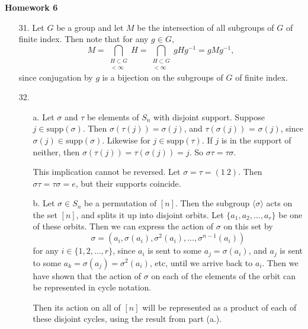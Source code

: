 \documentclass[11pt, reqno]{article}
\theoremstyle{plain}
\theoremstyle{definition}
\theoremstyle{remark}
\begin{document}
\topmargin=-40pt
\renewcommand{\headrulewidth}{1pt}
\renewcommand{\headsep}{20pt}
\thispagestyle{fancy}

{\Huge \bfseries \noindent Homework 6}

\begin{enumerate}
    \item[31.] Let $G$ be a group and let $M$ be the intersection of all subgroups of $G$ of finite
    index. Then note that for any $g \in G$,
    \[
        M = \bigcap_{\substack{H \subset G\\ [G:H] < \infty}}H  = \bigcap_{\substack{H \subset G\\ [G:H] < \infty}} gHg^{-1} = gMg^{-1},
    \]
    since conjugation by $g$ is a bijection on the subgroups of $G$ of finite index.

    \item[32.] \begin{enumerate}
        \item[a.] Let $\sigma$ and $\tau$ be elements of $S_n$ with disjoint support. Suppose $j \in \text{supp}(\sigma)$. 
        Then $\sigma(\tau(j)) = \sigma(j)$, and $\tau(\sigma(j))$ = $\sigma(j)$, since $\sigma(j) \in \text{supp}(\sigma)$.
        Likewise for $j \in \text{supp}(\tau)$. If $j$ is in the support of neither, then $\sigma(\tau(j)) = \tau(\sigma(j)) = j$.
        So $\sigma\tau = \tau \sigma$.

        This implication cannot be reversed. Let $\sigma = \tau = (1\ 2)$. Then $\sigma\tau = \tau\sigma = e$, but their supports 
        coincide. 

        \item[b.] Let $\sigma \in S_n$ be a permutation of $[n]$. Then the subgroup $\langle \sigma \rangle$ acts on
        the set $[n]$, and splits it up into disjoint orbits. Let $\{a_1, a_2, \dots, a_r\}$ be one of these orbits. Then
        we can express the action of $\sigma$ on this set by 
        \[
            \sigma = (a_i, \sigma(a_i), \sigma^2(a_i), \dots, \sigma^{n-1}(a_i))
        \]
        for any $i \in \{1, 2, \dots, r\}$, since $a_i$ is sent to some $a_j = \sigma(a_i)$, and $a_j$ is sent to some 
        $a_k = \sigma(a_j) = \sigma^2(a_i)$, etc, until we arrive back to $a_i$. Then we have shown that the action of $\sigma$
        on each of the elements of the orbit can be represented in cycle notation. 

        Then its action on all of $[n]$ will be represented as a product of each of these disjoint cycles, using 
        the result from part (a.).


\end{enumerate}
\end{enumerate}
\end{document}
